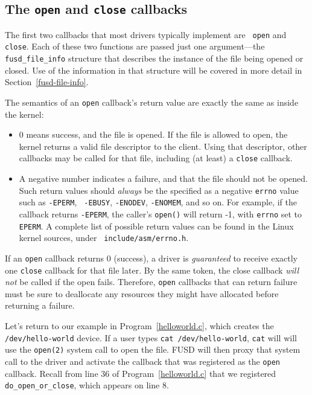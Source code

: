 \documentclass{article}
\begin{document}
\subsection{The {\tt open} and {\tt close} callbacks}
\label{open-close}

The first two callbacks that most drivers typically implement are {\tt
open} and {\tt close}.  Each of these two functions are passed just
one argument---the {\tt fusd\_file\_info} structure that describes the
instance of the file being opened or closed.  Use of the information
in that structure will be covered in more detail in
Section~\ref{fusd-file-info}.

The semantics of an {\tt open} callback's return value are exactly the
same as inside the kernel:
\begin{itemize}
\item 0 means success, and the file is opened.  If the file is allowed
to open, the kernel returns a valid file descriptor to the client.
Using that descriptor, other callbacks may be called for that file,
including (at least) a {\tt close} callback.

\item A negative number indicates a failure, and that the file should
not be opened.  Such return values should {\em always} be the
specified as a negative {\tt errno} value such as {\tt -EPERM}, {\tt
-EBUSY}, {\tt -ENODEV}, {\tt -ENOMEM}, and so on.  For example, if the
callback returns {\tt -EPERM}, the caller's {\tt open()} will return
-1, with {\tt errno} set to {\tt EPERM}.  A complete list of possible
return values can be found in the Linux kernel sources, under {\tt
include/asm/errno.h}.
\end{itemize}

If an {\tt open} callback returns 0 (success), a driver is {\em
guaranteed} to receive exactly one {\tt close} callback for that file
later.  By the same token, the close callback {\em will not} be called
if the open fails.  Therefore, {\tt open} callbacks that can return
failure must be sure to deallocate any resources they might have
allocated before returning a failure.

Let's return to our example in Program~\ref{helloworld.c}, which
creates the {\tt /dev/hello-world} device.  If a user types {\tt cat
/dev/hello-world}, {\tt cat} will will use the {\tt open(2)} system
call to open the file.  FUSD will then proxy that system call to the
driver and activate the callback that was registered as the {\tt open}
callback.  Recall from line 36 of Program~\ref{helloworld.c} that we
registered {\tt do\_open\_or\_close}, which appears on line 8.
\end{document}
